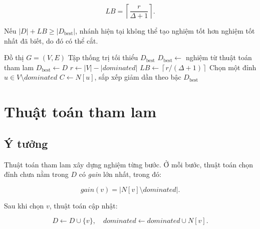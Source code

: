 \documentclass[12pt, a4paper]{report}
\newcommand{\MDS}{\textsc{Minimum Dominating Set}}
\begin{document}
\begin{equation}
  LB=\left\lceil \frac{r}{\Delta+1} \right\rceil.
  \label{eq:lower-bound}
\end{equation}

Nếu $|D|+LB \geq |D_{\mathrm{best}}|$, nhánh hiện tại không thể tạo nghiệm tốt hơn nghiệm tốt nhất đã biết,
do đó có thể cắt.

\begin{algorithm}[H]
\caption{Nhánh cận cho bài toán \MDS{}}
\begin{algorithmic}[1]
\Require Đồ thị $G=(V,E)$
\Ensure Tập thống trị tối thiểu $D_{\mathrm{best}}$
\State $D_{\mathrm{best}} \gets$ nghiệm từ thuật toán tham lam
      \State $D_{\mathrm{best}} \gets D$
    \EndIf
    \State \Return
  \EndIf
  \State $r \gets |V|-|dominated|$
  \State $LB \gets \left\lceil r/(\Delta+1)\right\rceil$
    \State \Return
  \EndIf
  \State Chọn một đỉnh $u \in V \setminus dominated$
  \State $C \gets N[u]$, sắp xếp giảm dần theo bậc
    \State {}
  \EndFor
\EndProcedure
\State {}
\State \Return $D_{\mathrm{best}}$
\end{algorithmic}
\end{algorithm}

\section{Thuật toán tham lam}

\subsection{Ý tưởng}

Thuật toán tham lam xây dựng nghiệm từng bước. Ở mỗi bước, thuật toán chọn đỉnh chưa nằm trong $D$ có
\textit{gain} lớn nhất, trong đó:

\begin{equation}
  gain(v)=|N[v]\setminus dominated|.
\end{equation}

Sau khi chọn $v$, thuật toán cập nhật:

\begin{equation}
  D \gets D\cup\{v\}, \quad dominated \gets dominated \cup N[v].
\end{equation}
\end{document}
